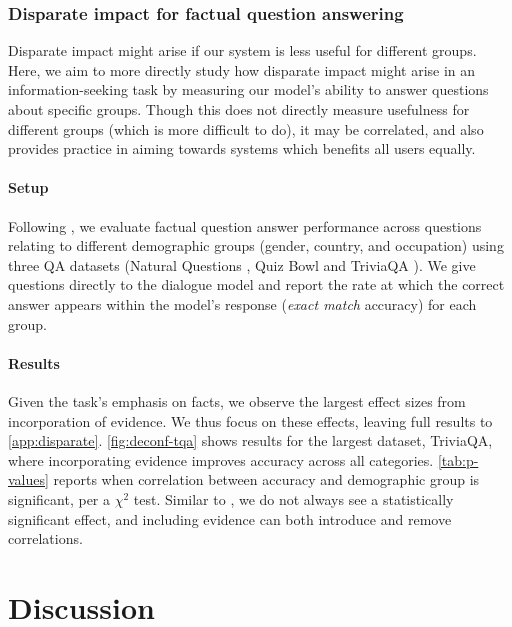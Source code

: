 \subsubsection{Disparate impact for factual question answering} \label{sec:disparate-impact}

Disparate impact might arise if our system is less useful for different groups. Here, we aim to more directly study how disparate impact might arise in an information-seeking task by measuring our model's ability to answer questions about specific groups. Though this does not directly measure usefulness for different groups (which is more difficult to do), it may be correlated, and also provides practice in aiming towards systems which benefits all users equally.

\paragraph{Setup}
Following \citet{gor2021deconf}, we evaluate factual question answer performance across questions relating to different demographic groups (gender, country, and occupation) using three QA datasets (Natural Questions \citep{kwiatkowski2019natural}, Quiz Bowl \citep{graber2012besting}  and TriviaQA \citep{joshi2017triviaqa}). We give questions directly to the dialogue model and report the rate at which the correct answer appears within the model's response (\emph{exact match} accuracy) for each group.


\paragraph{Results}
Given the task's emphasis on facts, we observe the largest effect sizes from incorporation of evidence. We thus focus on these effects, leaving full results to \ref{app:disparate}.
\ref{fig:deconf-tqa} shows results for the largest dataset, TriviaQA, where incorporating evidence improves accuracy across all categories. 
\ref{tab:p-values} reports when correlation between accuracy and demographic group is significant, per a $\chi^2$ test.  Similar to \citet{gor2021deconf}, we do not always see a statistically significant effect, and including evidence can both introduce and remove correlations.

\section{Discussion}
\label{sec:discussion}

